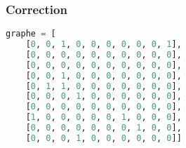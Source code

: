 \documentclass[svgnames,11pt]{beamer}
\begin{document}
\begin{frame}[fragile]
    \frametitle{Correction}

\begin{center}
\begin{lstlisting}[language=Python 
     , xleftmargin=2em, xrightmargin=2em]
graphe = [
    [0, 0, 1, 0, 0, 0, 0, 0, 0, 1],
    [0, 0, 0, 0, 0, 0, 0, 0, 0, 0],
    [0, 0, 0, 0, 0, 0, 0, 0, 0, 0],
    [0, 0, 1, 0, 0, 0, 0, 0, 0, 0],
    [0, 1, 1, 0, 0, 0, 0, 0, 0, 0],
    [0, 0, 0, 1, 0, 0, 0, 0, 0, 0],
    [0, 0, 0, 0, 0, 0, 0, 0, 0, 0],
    [1, 0, 0, 0, 0, 0, 1, 0, 0, 0],
    [0, 0, 0, 0, 0, 0, 0, 1, 0, 0],
    [0, 0, 0, 1, 0, 0, 0, 0, 0, 0]]
\end{lstlisting}
\end{center} 

\end{frame}
\end{document}
